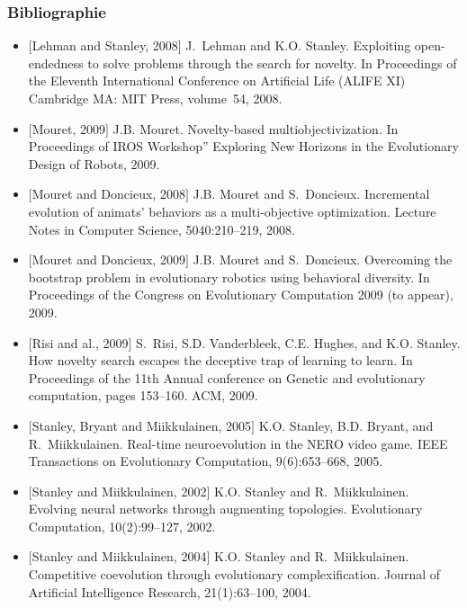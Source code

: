 \documentclass{beamer}
\begin{document}

\begin{frame}[allowframebreaks]
\frametitle{Bibliographie}
\begin{itemize}
    \item $[$Lehman and Stanley, 2008$]$
    J.~Lehman and K.O. Stanley.
    Exploiting open-endedness to solve problems through the search for
    novelty.
    In  Proceedings of the Eleventh International Conference on
    Artificial Life (ALIFE XI) Cambridge MA: MIT Press, volume~54, 2008.

    \item $[$Mouret, 2009$]$
    J.B. Mouret.
    Novelty-based multiobjectivization.
    In  Proceedings of IROS Workshop” Exploring New Horizons in the
    Evolutionary Design of Robots, 2009.

    \item $[$Mouret and Doncieux, 2008$]$
    J.B. Mouret and S.~Doncieux.
    Incremental evolution of animats' behaviors as a multi-objective
    optimization.
    Lecture Notes in Computer Science, 5040:210--219, 2008.

    \item $[$Mouret and Doncieux, 2009$]$
    J.B. Mouret and S.~Doncieux.
    Overcoming the bootstrap problem in evolutionary robotics using
    behavioral diversity.
    In  Proceedings of the Congress on Evolutionary Computation 2009
    (to appear), 2009.

    \item $[$Risi and al., 2009$]$
    S.~Risi, S.D. Vanderbleek, C.E. Hughes, and K.O. Stanley.
    How novelty search escapes the deceptive trap of learning to learn.
    In  Proceedings of the 11th Annual conference on Genetic and
    evolutionary computation, pages 153--160. ACM, 2009.

    \item $[$Stanley, Bryant and Miikkulainen, 2005$]$
    K.O. Stanley, B.D. Bryant, and R.~Miikkulainen.
    Real-time neuroevolution in the NERO video game.
    IEEE Transactions on Evolutionary Computation, 9(6):653--668,
    2005.

    \item $[$Stanley and Miikkulainen, 2002$]$
    K.O. Stanley and R.~Miikkulainen.
    Evolving neural networks through augmenting topologies.
    Evolutionary Computation, 10(2):99--127, 2002.

    \item $[$Stanley and Miikkulainen, 2004$]$
    K.O. Stanley and R.~Miikkulainen.
    Competitive coevolution through evolutionary complexification.
    Journal of Artificial Intelligence Research, 21(1):63--100,
    2004.

\end{itemize}
\end{frame}
\end{document}
